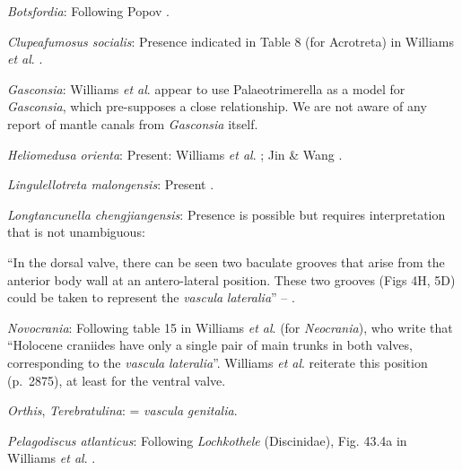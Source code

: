 \documentclass[openany]{book}
\theoremstyle{definition}
\theoremstyle{definition}
\theoremstyle{definition}
\theoremstyle{remark}
\begin{document}
\hypertarget{Botsfordia-coding-175}{}
\emph{Botsfordia}: Following Popov \citeyearpar{Popov1992TheCambrian}.

\hypertarget{Clupeafumosus_socialis-coding-175}{}
\emph{Clupeafumosus socialis}: Presence indicated in Table 8 (for
Acrotreta) in Williams \emph{et al}.
\citeyearpar{Williams2000LinguliformeaCraniiformea}.

\hypertarget{Gasconsia-coding-175}{}
\emph{Gasconsia}: Williams \emph{et al}. \citeyearpar[table
15]{Williams2000LinguliformeaCraniiformea} appear to use
Palaeotrimerella \citep[as drawn in][]{Williams1997Introduction} as a
model for \emph{Gasconsia}, which pre-supposes a close relationship. We
are not aware of any report of mantle canals from \emph{Gasconsia}
itself.

\hypertarget{Heliomedusa_orienta-coding-175}{}
\emph{Heliomedusa orienta}: Present: Williams \emph{et al}.
\citeyearpar{Williams2000LinguliformeaCraniiformea}; Jin \& Wang
\citeyearpar{Jin1992Revisionof}.

\hypertarget{Lingulellotreta_malongensis-coding-175}{}
\emph{Lingulellotreta malongensis}: Present
\citep{Williams2000LinguliformeaCraniiformea}.

\hypertarget{Longtancunella_chengjiangensis-coding-175}{}
\emph{Longtancunella chengjiangensis}: Presence is possible but requires
interpretation that is not unambiguous:

``In the dorsal valve, there can be seen two baculate grooves that arise
from the\\
anterior body wall at an antero-lateral position. These two grooves
(Figs 4H, 5D) could be taken to represent the \emph{vascula}
\emph{lateralia}'' -- \citet{Zhang2007Agregarious}.

\hypertarget{Novocrania-coding-175}{}
\emph{Novocrania}: Following table 15 in Williams \emph{et al}.
\citeyearpar{Williams2000LinguliformeaCraniiformea} (for
\emph{Neocrania}), who write that ``Holocene craniides have only a
single pair of main trunks in both valves, corresponding to the
\emph{vascula} \emph{lateralia}''. Williams \emph{et al}.
\citeyearpar{Williams2007Supplement} reiterate this position (p.~2875),
at least for the ventral valve.

\hypertarget{Orthis-coding-175}{}
\emph{Orthis}, \emph{Terebratulina}: = \emph{vascula} \emph{genitalia}.

\hypertarget{Pelagodiscus_atlanticus-coding-175}{}
\emph{Pelagodiscus atlanticus}: Following \emph{Lochkothele}
(Discinidae), Fig. 43.4a in Williams \emph{et al}.
\citeyearpar{Williams2000LinguliformeaCraniiformea}.
\end{document}
